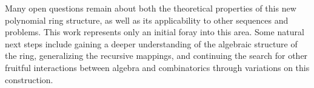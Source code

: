 \documentclass{article}
\theoremstyle{plain}
\theoremstyle{definition}
\begin{document}
Many open questions remain about both the theoretical properties of this new polynomial ring structure, as well as its applicability to other sequences and problems. This work represents only an initial foray into this area. Some natural next steps include gaining a deeper understanding of the algebraic structure of the ring, generalizing the recursive mappings, and continuing the search for other fruitful interactions between algebra and combinatorics through variations on this construction.

\begingroup
\raggedright


\endgroup
\end{document}
